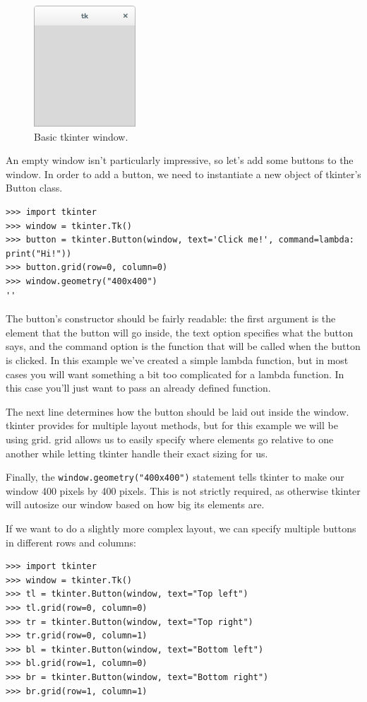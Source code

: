 \documentclass[11pt]{cselabheader}
\begin{document}
\begin{figure}[h]
  \centering
  \includegraphics[width=1.5in]{img/tk_basic}
  \caption{Basic tkinter window.}
  \label{tk_basic}
\end{figure}

An empty window isn't particularly impressive, so let's add some buttons
to the window. In order to add a button, we need to instantiate a new object
of tkinter's Button class.

\begin{lstlisting}[style=ipython]
>>> import tkinter
>>> window = tkinter.Tk()
>>> button = tkinter.Button(window, text='Click me!', command=lambda: print("Hi!"))
>>> button.grid(row=0, column=0)
>>> window.geometry("400x400")
''
\end{lstlisting}

The button's constructor should be fairly readable: the first argument is
the element that the button will go inside, the text option specifies what
the button says, and the command option is the function that will be called
when the button is clicked. In this example we've created a simple lambda
function, but in most cases you will want something a bit too complicated
for a lambda function. In this case you'll just want to pass an already defined
function.

The next line determines how the button should be laid out inside the window.
tkinter provides for multiple layout methods, but for this example we will
be using grid. grid allows us to easily specify where elements go relative
to one another while letting tkinter handle their exact sizing for us.

Finally, the \lstinline{window.geometry("400x400")} statement tells tkinter to
make our window 400 pixels by 400 pixels. This is not strictly required, as
otherwise tkinter will autosize our window based on how big its elements are.

If we want to do a slightly more complex layout, we can specify multiple buttons
in different rows and columns:

\begin{lstlisting}[style=ipython]
>>> import tkinter
>>> window = tkinter.Tk()
>>> tl = tkinter.Button(window, text="Top left")
>>> tl.grid(row=0, column=0)
>>> tr = tkinter.Button(window, text="Top right")
>>> tr.grid(row=0, column=1)
>>> bl = tkinter.Button(window, text="Bottom left")
>>> bl.grid(row=1, column=0)
>>> br = tkinter.Button(window, text="Bottom right")
>>> br.grid(row=1, column=1)
\end{lstlisting}
\end{document}
